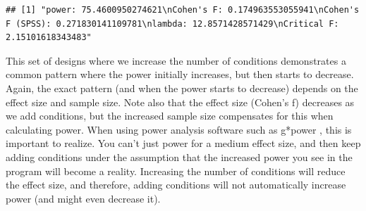 \documentclass[
]{book}
\newenvironment{Shaded}{\begin{snugshade}}{\end{snugshade}}
\newcommand{\CommentTok}[1]{\textcolor[rgb]{0.56,0.35,0.01}{\textit{#1}}}
\newcommand{\FunctionTok}[1]{\textcolor[rgb]{0.00,0.00,0.00}{#1}}
\newcommand{\NormalTok}[1]{#1}
\newcommand{\SpecialCharTok}[1]{\textcolor[rgb]{0.00,0.00,0.00}{#1}}
\newcommand{\StringTok}[1]{\textcolor[rgb]{0.31,0.60,0.02}{#1}}
\begin{document}
\begin{Shaded}
\end{Shaded}

\begin{verbatim}
## [1] "power: 75.4600950274621\nCohen's F: 0.174963553055941\nCohen's F (SPSS): 0.271830141109781\nlambda: 12.8571428571429\nCritical F: 2.15101618343483"
\end{verbatim}

\begin{Shaded}
\end{Shaded}

This set of designs where we increase the number of conditions demonstrates a common pattern where the power initially increases, but then starts to decrease.
Again, the exact pattern (and when the power starts to decrease) depends on the effect size and sample size.
Note also that the effect size (Cohen's f) decreases as we add conditions, but the increased sample size compensates for this when calculating power.
When using power analysis software such as g*power \citep{faul2007g}, this is important to realize.
You can't just power for a medium effect size, and then keep adding conditions under the assumption that the increased power you see in the program will become a reality.
Increasing the number of conditions will reduce the effect size, and therefore, adding conditions will not automatically increase power (and might even decrease it).
\end{document}

